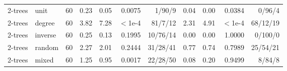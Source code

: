 \begin{table}[t]
\begin{tabular}{llrrrrrrrrr}
2-trees & unit & 60 & 0.23 & 0.05 & 0.0075 & 1/90/9 & 0.04 & 0.00 & 0.0384 & 0/96/4 \\
2-trees & degree & 60 & 3.82 & 7.28 & $<$1e-4 & 81/7/12 & 2.31 & 4.91 & $<$1e-4 & 68/12/19 \\
2-trees & inverse & 60 & 0.25 & 0.13 & 0.1995 & 10/76/14 & 0.00 & 0.00 & 1.0000 & 0/100/0 \\
2-trees & random & 60 & 2.27 & 2.01 & 0.2444 & 31/28/41 & 0.77 & 0.74 & 0.7989 & 25/54/21 \\
2-trees & mixed & 60 & 1.25 & 0.95 & 0.0017 & 22/28/50 & 0.08 & 0.20 & 0.9499 & 8/84/8 \\
\bottomrule
\end{tabular}
\end{table}
